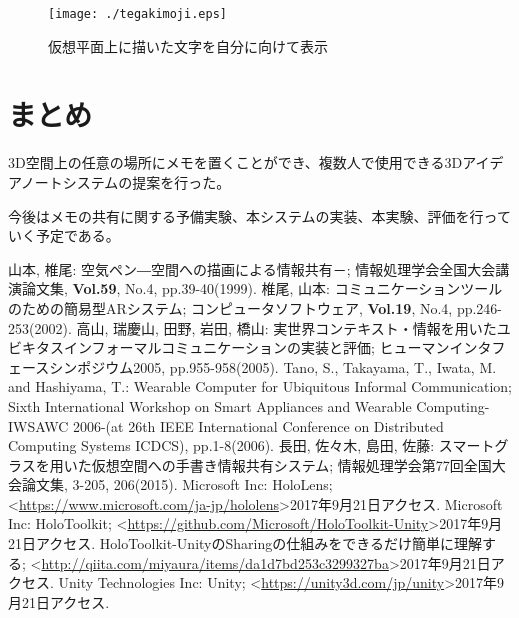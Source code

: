 \documentclass[twocolumn, a4paper]{UECIEresume}
\begin{document}
\vspace{0.5zh}

\begin{figure}[h]
  \begin{center}
    \texttt{[image: ./tegakimoji.eps]}
    \caption{仮想平面上に描いた文字を自分に向けて表示}
    \label{fig:rittai}
  \end{center}
\end{figure}

\vspace{-1zh}
\vspace{-1zh}

\section{まとめ}
3D空間上の任意の場所にメモを置くことができ、複数人で使用できる3Dアイデアノートシステムの提案を行った。

今後はメモの共有に関する予備実験、本システムの実装、本実験、評価を行っていく予定である。

\vspace{-1zh}

{\small
\begin{thebibliography}{99}
        山本, 椎尾:
        空気ペン―空間への描画による情報共有－;
        情報処理学会全国大会講演論文集,
        {\bf Vol.59}, No.4, pp.39-40(1999).
	椎尾, 山本:
	コミュニケーションツールのための簡易型ARシステム;
	コンピュータソフトウェア, 
        {\bf Vol.19}, No.4, pp.246-253(2002).
	高山, 瑞慶山, 田野, 岩田, 橋山:
	実世界コンテキスト・情報を用いたユビキタスインフォーマルコミュニケーションの実装と評価;
	ヒューマンインタフェースシンポジウム2005,
        pp.955-958(2005).
        Tano, S., Takayama, T., Iwata, M. and Hashiyama, T.:
        Wearable Computer for Ubiquitous Informal Communication;
        Sixth International Workshop on Smart Appliances and Wearable Computing-IWSAWC 2006-(at 26th IEEE International Conference on Distributed Computing Systems ICDCS),
        pp.1-8(2006).
        長田, 佐々木, 島田, 佐藤:
        スマートグラスを用いた仮想空間への手書き情報共有システム;
        情報処理学会第77回全国大会論文集,
        3-205, 206(2015).
        Microsoft Inc:
        HoloLens;
        \textless\url{https://www.microsoft.com/ja-jp/hololens}\textgreater2017年9月21日アクセス.
        Microsoft Inc:
        HoloToolkit;
        \textless\url{https://github.com/Microsoft/HoloToolkit-Unity}\textgreater2017年9月21日アクセス.
        HoloToolkit-UnityのSharingの仕組みをできるだけ簡単に理解する; 
        \textless\url{http://qiita.com/miyaura/items/da1d7bd253c3299327ba}\textgreater2017年9月21日アクセス.
        Unity Technologies Inc:
        Unity;
        \textless\url{https://unity3d.com/jp/unity}\textgreater2017年9月21日アクセス.

\end{thebibliography}
}
\end{document}
